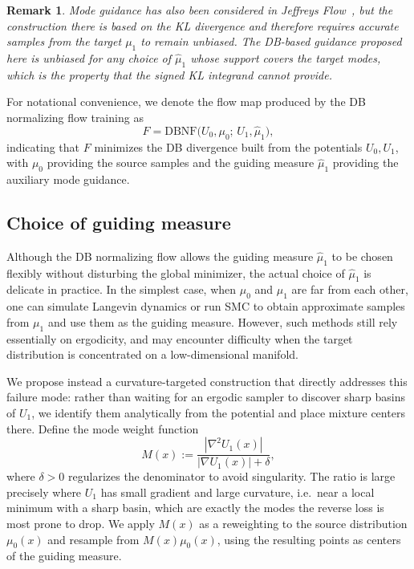 \documentclass{article}
\newtheorem*{remark}{Remark}
\theoremstyle{plain}
\begin{document}
\begin{remark}
    Mode guidance has also been considered in Jeffreys Flow~\citep{lin2026jeffreys}, but the construction there is based on the KL divergence and therefore requires accurate samples from the target $\mu_1$ to remain unbiased. The DB-based guidance proposed here is unbiased for any choice of $\hat\mu_1$ whose support covers the target modes, which is the property that the signed KL integrand cannot provide.
\end{remark}

For notational convenience, we denote the flow map produced by the DB normalizing flow training as
\begin{equation}
    F = \mathrm{DBNF}\bigl(U_0, \mu_0;\, U_1, \hat\mu_1\bigr),
\end{equation}
indicating that $F$ minimizes the DB divergence built from the potentials $U_0, U_1$, with $\mu_0$ providing the source samples and the guiding measure $\hat\mu_1$ providing the auxiliary mode guidance.

\subsection{Choice of guiding measure}

Although the DB normalizing flow allows the guiding measure $\hat\mu_1$ to be chosen flexibly without disturbing the global minimizer, the actual choice of $\hat\mu_1$ is delicate in practice. In the simplest case, when $\mu_0$ and $\mu_1$ are far from each other, one can simulate Langevin dynamics or run SMC to obtain approximate samples from $\mu_1$ and use them as the guiding measure. However, such methods still rely essentially on ergodicity, and may encounter difficulty when the target distribution is concentrated on a low-dimensional manifold.

We propose instead a curvature-targeted construction that directly addresses this failure mode: rather than waiting for an ergodic sampler to discover sharp basins of $U_1$, we identify them analytically from the potential and place mixture centers there. Define the mode weight function
\begin{equation}
    M(x) := \frac{|\nabla^2 U_1(x)|}{|\nabla U_1(x)|+\delta},
\end{equation}
where $\delta>0$ regularizes the denominator to avoid singularity. The ratio is large precisely where $U_1$ has small gradient and large curvature, i.e.\ near a local minimum with a sharp basin, which are exactly the modes the reverse loss is most prone to drop. We apply $M(x)$ as a reweighting to the source distribution $\mu_0(x)$ and resample from $M(x) \mu_0(x)$, using the resulting points as centers of the guiding measure.
\end{document}
